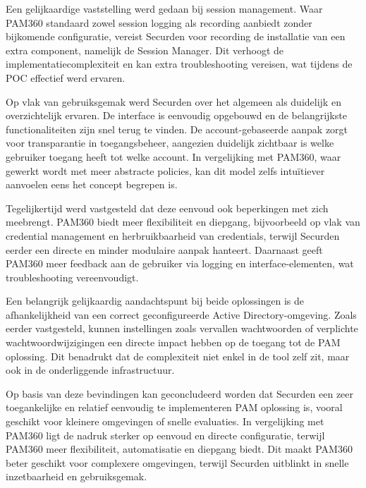 Een gelijkaardige vaststelling werd gedaan bij session management. Waar PAM360 standaard zowel session logging als recording aanbiedt zonder bijkomende configuratie, vereist Securden voor recording de installatie van een extra component, namelijk de Session Manager. Dit verhoogt de implementatiecomplexiteit en kan extra troubleshooting vereisen, wat tijdens de POC effectief werd ervaren.

Op vlak van gebruiksgemak werd Securden over het algemeen als duidelijk en overzichtelijk ervaren. De interface is eenvoudig opgebouwd en de belangrijkste functionaliteiten zijn snel terug te vinden. De account-gebaseerde aanpak zorgt voor transparantie in toegangsbeheer, aangezien duidelijk zichtbaar is welke gebruiker toegang heeft tot welke account. In vergelijking met PAM360, waar gewerkt wordt met meer abstracte policies, kan dit model zelfs intuïtiever aanvoelen eens het concept begrepen is.

Tegelijkertijd werd vastgesteld dat deze eenvoud ook beperkingen met zich meebrengt. PAM360 biedt meer flexibiliteit en diepgang, bijvoorbeeld op vlak van credential management en herbruikbaarheid van credentials, terwijl Securden eerder een directe en minder modulaire aanpak hanteert. Daarnaast geeft PAM360 meer feedback aan de gebruiker via logging en interface-elementen, wat troubleshooting vereenvoudigt.

Een belangrijk gelijkaardig aandachtspunt bij beide oplossingen is de afhankelijkheid van een correct geconfigureerde Active Directory-omgeving. Zoals eerder vastgesteld, kunnen instellingen zoals vervallen wachtwoorden of verplichte wachtwoordwijzigingen een directe impact hebben op de toegang tot de PAM oplossing. Dit benadrukt dat de complexiteit niet enkel in de tool zelf zit, maar ook in de onderliggende infrastructuur. 

Op basis van deze bevindingen kan geconcludeerd worden dat Securden een zeer toegankelijke en relatief eenvoudig te implementeren PAM oplossing is, vooral geschikt voor kleinere omgevingen of snelle evaluaties. In vergelijking met PAM360 ligt de nadruk sterker op eenvoud en directe configuratie, terwijl PAM360 meer flexibiliteit, automatisatie en diepgang biedt. Dit maakt PAM360 beter geschikt voor complexere omgevingen, terwijl Securden uitblinkt in snelle inzetbaarheid en gebruiksgemak.

